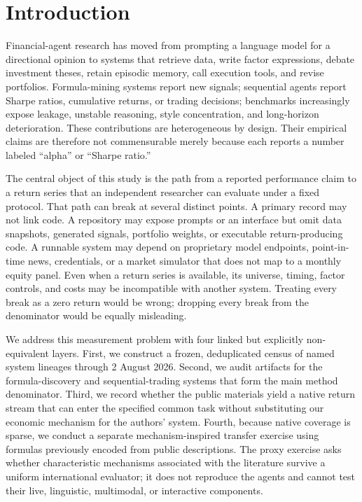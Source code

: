 \documentclass[11pt]{article}
\begin{document}
\section{Introduction}\label{sec:introduction}

Financial-agent research has moved from prompting a language model for a directional opinion to systems that retrieve data, write factor expressions, debate investment theses, retain episodic memory, call execution tools, and revise portfolios. Formula-mining systems report new signals; sequential agents report Sharpe ratios, cumulative returns, or trading decisions; benchmarks increasingly expose leakage, unstable reasoning, style concentration, and long-horizon deterioration. These contributions are heterogeneous by design. Their empirical claims are therefore not commensurable merely because each reports a number labeled ``alpha'' or ``Sharpe ratio.''

The central object of this study is the path from a reported performance claim to a return series that an independent researcher can evaluate under a fixed protocol. That path can break at several distinct points. A primary record may not link code. A repository may expose prompts or an interface but omit data snapshots, generated signals, portfolio weights, or executable return-producing code. A runnable system may depend on proprietary model endpoints, point-in-time news, credentials, or a market simulator that does not map to a monthly equity panel. Even when a return series is available, its universe, timing, factor controls, and costs may be incompatible with another system. Treating every break as a zero return would be wrong; dropping every break from the denominator would be equally misleading.

We address this measurement problem with four linked but explicitly non-equivalent layers. First, we construct a frozen, deduplicated census of \SystemCount{} named system lineages through 2 August 2026. Second, we audit artifacts for the \MethodSystemCount{} formula-discovery and sequential-trading systems that form the main method denominator. Third, we record whether the public materials yield a native return stream that can enter the specified common task without substituting our economic mechanism for the authors' system. Fourth, because native coverage is sparse, we conduct a separate mechanism-inspired transfer exercise using \ProxyCount{} formulas previously encoded from public descriptions. The proxy exercise asks whether characteristic mechanisms associated with the literature survive a uniform international evaluator; it does not reproduce the agents and cannot test their live, linguistic, multimodal, or interactive components.
\end{document}
